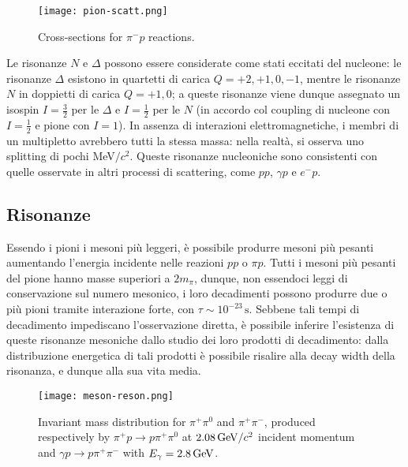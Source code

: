 \begin{figure}[!hb]
	\centering
	\texttt{[image: pion-scatt.png]}
	\caption{Cross-sections for $ \pi^- p $ reactions.}
	\label{pion-scatt}
\end{figure}

Le risonanze $ N $ e $ \Delta $ possono essere considerate come stati eccitati del nucleone: le risonanze $ \Delta $ esistono in quartetti di carica $ Q = +2,+1,0,-1 $, mentre le risonanze $ N $ in doppietti di carica $ Q = +1,0 $; a queste risonanze viene dunque assegnato un isospin $ I = \frac{3}{2} $ per le $ \Delta $ e $ I = \frac{1}{2} $ per le $ N $ (in accordo col coupling di nucleone con $ I = \frac{1}{2} $ e pione con $ I = 1 $). In assenza di interazioni elettromagnetiche, i membri di un multipletto avrebbero tutti la stessa massa: nella realtà, si osserva uno splitting di pochi MeV$ /c^2 $. Queste risonanze nucleoniche sono consistenti con quelle osservate in altri processi di scattering, come $ pp $, $ \gamma p $ e $ e^- p $.

\subsection{Risonanze}

Essendo i pioni i mesoni più leggeri, è possibile produrre mesoni più pesanti aumentando l'energia incidente nelle reazioni $ pp $ o $ \pi p $. Tutti i mesoni più pesanti del pione hanno masse superiori a $ 2m_{\pi} $, dunque, non essendoci leggi di conservazione sul numero mesonico, i loro decadimenti possono produrre due o più pioni tramite interazione forte, con $ \tau \sim 10^{-23}\,\text{s} $. Sebbene tali tempi di decadimento impediscano l'osservazione diretta, è possibile inferire l'esistenza di queste risonanze mesoniche dallo studio dei loro prodotti di decadimento: dalla distribuzione energetica di tali prodotti è possibile risalire alla decay width della risonanza, e dunque alla sua vita media.

\begin{figure}[!h]
	\centering
	\texttt{[image: meson-reson.png]}
	\caption{Invariant mass distribution for $ \pi^+ \pi^0 $ and $ \pi^+ \pi^- $, produced respectively by $ \pi^+ p \rightarrow p \pi^+ \pi^0 $ at $ 2.08\,\mathrm{GeV}/c^2 $ incident momentum and $ \gamma p \rightarrow p \pi^+ \pi^- $ with $ E_{\gamma} = 2.8\,\mathrm{GeV} $.}
	\label{meson-reson}
\end{figure}

